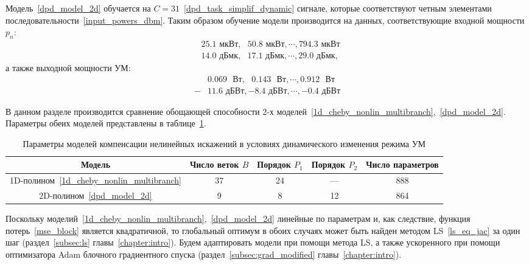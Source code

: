 Модель~\eqref{dpd_model_2d} обучается на $C=31$~\eqref{dpd_task_simplif_dynamic} сигнале, которые соответствуют четным элементами последовательности~\eqref{input_powers_dbm}. Таким образом обучение модели производится на данных, соответствующие входной мощности $p_n$:
\begin{subequations}\label{input_powers_even}
	\begin{align}
		&25.1 \text{ мкВт}, \text{ }50.8\text{ мкВт}, \cdots, 794.3 \text{ мкВт} \nonumber \\
		&14.0 \text{ дБмк}, \text{ }17.1\text{ дБмк}, \cdots, 29.0 \text{ дБмк},
	\end{align}
\end{subequations}
а также выходной мощности УМ:
\begin{align}
	&0.069 \text{ }\text{Вт}, \text{ }0.143\text{ }\text{Вт}, \cdots, 0.912 \text{ }\text{Вт} \nonumber \\
	-&11.6\text{ дБВт},-8.4\text{ дБВт}, \cdots,-0.4\text{ дБВт} 
	\label{powers_all_even}
\end{align}

В данном разделе производится сравнение обощающей способности 2-х моделей~\eqref{1d_cheby_nonlin_multibranch},~\eqref{dpd_model_2d}. Параметры обеих моделей представлены в таблице~\ref{table:dpd_dynamic_param_table}.
\begin{table}[htbp]
	\centering
	\begin{tabular}{|c|c|c|c|c|}
		\hline
		Модель & Число веток $B$ & Порядок $P_1$ & Порядок $P_2$ & Число параметров \\
		\hline
		1D-полином~\eqref{1d_cheby_nonlin_multibranch}  & 37  & 24  & --- & 888 \\
		\hline
		2D-полином~\eqref{dpd_model_2d}  & 9  & 8  & 12  & 864 \\
		\hline
	\end{tabular}
	\caption{Параметры моделей компенсации нелинейных искажений в условиях динамического изменения режима УМ}
	\label{table:dpd_dynamic_param_table}
\end{table}

Поскольку моделий~\eqref{1d_cheby_nonlin_multibranch},~\eqref{dpd_model_2d} линейные по параметрам и, как следствие, функция потерь~\eqref{mse_block} является квадратичной, то глобальный оптимум в обоих случаях может быть найден методом LS~\eqref{ls_eq_jac} за один шаг (раздел~\ref{subsec:ls} главы~\ref{chapter:intro}). Будем адаптировать модели при помощи метода LS, а также ускоренного при помощи оптимизатора Adam блочного градиентного спуска (раздел~\ref{subsec:grad_modified} главы~\ref{chapter:intro}). 

